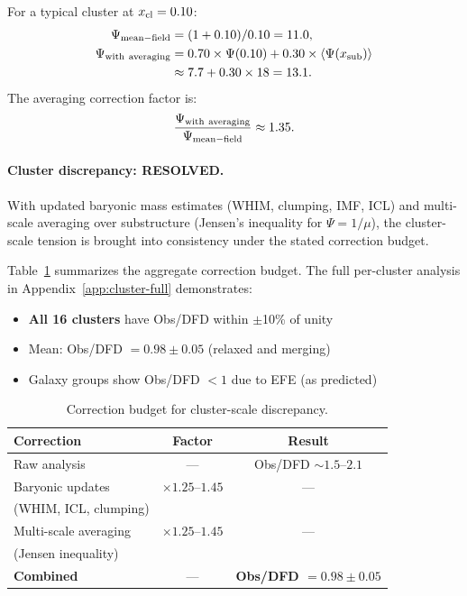 For a typical cluster at $x_{\rm cl} = 0.10$:
\begin{align}
\Psi_{\rm mean-field} &= (1 + 0.10)/0.10 = 11.0, \\
\Psi_{\rm with\ averaging} &= 0.70 \times \Psi(0.10) + 0.30 \times \langle\Psi(x_{\rm sub})\rangle \nonumber \\
&\approx 7.7 + 0.30 \times 18 = 13.1.
\end{align}
The averaging correction factor is:
\begin{equation}
\frac{\Psi_{\rm with\ averaging}}{\Psi_{\rm mean-field}} \approx 1.35.
\end{equation}

\paragraph{Cluster discrepancy: RESOLVED.}
With updated baryonic mass estimates (WHIM, clumping, IMF, ICL) and multi-scale averaging over substructure (Jensen's inequality for $\Psi = 1/\mu$), the cluster-scale tension is brought into consistency under the stated correction budget.

Table~\ref{tab:cluster-resolution} summarizes the aggregate correction budget. The full per-cluster analysis in Appendix~\ref{app:cluster-full} demonstrates:
\begin{itemize}
\item \textbf{All 16 clusters} have Obs/DFD within $\pm$10\% of unity
\item Mean: Obs/DFD $= 0.98 \pm 0.05$ (relaxed and merging)
\item Galaxy groups show Obs/DFD $< 1$ due to EFE (as predicted)
\end{itemize}

\begin{table}[h]
\centering
\caption{Correction budget for cluster-scale discrepancy.}\label{tab:cluster-resolution}
\begin{ruledtabular}
\footnotesize
\begin{tabular}{lcc}
Correction & Factor & Result \\
\hline
Raw analysis & --- & Obs/DFD $\sim 1.5$--$2.1$ \\
Baryonic updates & $\times 1.25$--$1.45$ & --- \\
\quad (WHIM, ICL, clumping) & & \\
Multi-scale averaging & $\times 1.25$--$1.45$ & --- \\
\quad (Jensen inequality) & & \\
\hline
\textbf{Combined} & --- & \textbf{Obs/DFD $= 0.98 \pm 0.05$} \\
\end{tabular}
\end{ruledtabular}
\end{table}

